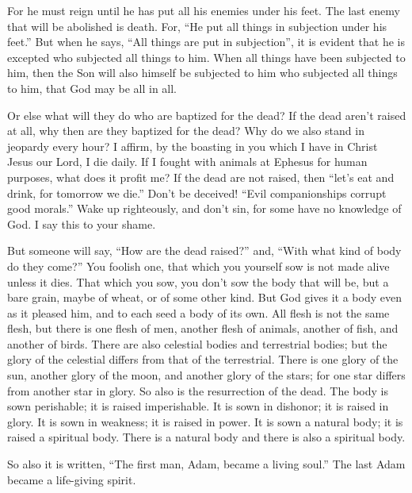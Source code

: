 {For he must reign until he has put all his enemies under his feet.
The last enemy that will be abolished is death.
For, “He put all things in subjection under his feet.” But when he says, “All things are put in subjection”, it is evident that he is excepted who subjected all things to him.
When all things have been subjected to him, then the Son will also himself be subjected to him who subjected all things to him, that God may be all in all.
\par }{\PP {}Or else what will they do who are baptized for the dead? If the dead aren’t raised at all, why then are they baptized for the dead?
Why do we also stand in jeopardy every hour?
I affirm, by the boasting in you which I have in Christ Jesus our Lord, I die daily.
If I fought with animals at Ephesus for human purposes, what does it profit me? If the dead are not raised, then “let’s eat and drink, for tomorrow we die.”
Don’t be deceived! “Evil companionships corrupt good morals.”
Wake up righteously, and don’t sin, for some have no knowledge of God. I say this to your shame.
\par }{\PP {}But someone will say, “How are the dead raised?” and, “With what kind of body do they come?”
You foolish one, that which you yourself sow is not made alive unless it dies.
That which you sow, you don’t sow the body that will be, but a bare grain, maybe of wheat, or of some other kind.
But God gives it a body even as it pleased him, and to each seed a body of its own.
All flesh is not the same flesh, but there is one flesh of men, another flesh of animals, another of fish, and another of birds.
There are also celestial bodies and terrestrial bodies; but the glory of the celestial differs from that of the terrestrial.
There is one glory of the sun, another glory of the moon, and another glory of the stars; for one star differs from another star in glory.
So also is the resurrection of the dead. The body is sown perishable; it is raised imperishable.
It is sown in dishonor; it is raised in glory. It is sown in weakness; it is raised in power.
It is sown a natural body; it is raised a spiritual body. There is a natural body and there is also a spiritual body.
\par }{\PP {}So also it is written, “The first man, Adam, became a living soul.”
 The last Adam became a life-giving spirit.
}
